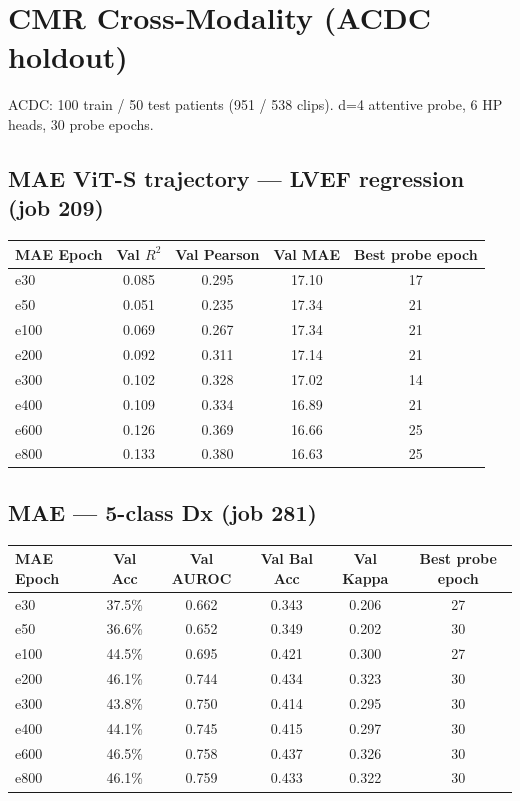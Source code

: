 \documentclass{article}
\begin{document}
\section{CMR Cross-Modality (ACDC holdout)}\label{sec:cmr}

ACDC: 100 train / 50 test patients (951 / 538 clips). d=4 attentive probe, 6 HP heads, 30 probe epochs.

\subsection{MAE ViT-S trajectory --- LVEF regression (job 209)}

\begin{center}
\begin{tabular}{lcccc}
\toprule
MAE Epoch & Val $R^2$ & Val Pearson & Val MAE & Best probe epoch \\
\midrule
e30  & 0.085 & 0.295 & 17.10 & 17 \\
e50  & 0.051 & 0.235 & 17.34 & 21 \\
e100 & 0.069 & 0.267 & 17.34 & 21 \\
e200 & 0.092 & 0.311 & 17.14 & 21 \\
e300 & 0.102 & 0.328 & 17.02 & 14 \\
e400 & 0.109 & 0.334 & 16.89 & 21 \\
e600 & 0.126 & 0.369 & 16.66 & 25 \\
e800 & 0.133 & 0.380 & 16.63 & 25 \\
\bottomrule
\end{tabular}
\end{center}

\subsection{MAE --- 5-class Dx (job 281)}

\begin{center}
\begin{tabular}{lccccc}
\toprule
MAE Epoch & Val Acc & Val AUROC & Val Bal Acc & Val Kappa & Best probe epoch \\
\midrule
e30  & 37.5\% & 0.662 & 0.343 & 0.206 & 27 \\
e50  & 36.6\% & 0.652 & 0.349 & 0.202 & 30 \\
e100 & 44.5\% & 0.695 & 0.421 & 0.300 & 27 \\
e200 & 46.1\% & 0.744 & 0.434 & 0.323 & 30 \\
e300 & 43.8\% & 0.750 & 0.414 & 0.295 & 30 \\
e400 & 44.1\% & 0.745 & 0.415 & 0.297 & 30 \\
e600 & 46.5\% & 0.758 & 0.437 & 0.326 & 30 \\
e800 & 46.1\% & 0.759 & 0.433 & 0.322 & 30 \\
\bottomrule
\end{tabular}
\end{center}
\end{document}
